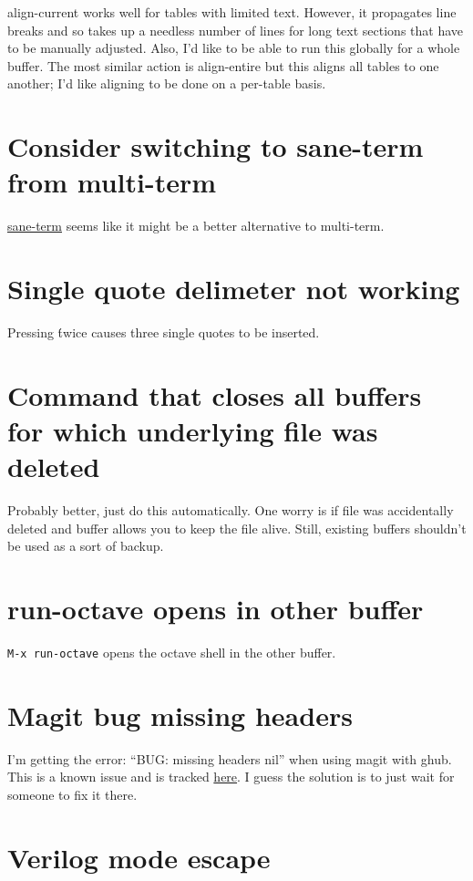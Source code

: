 \documentclass{default}
\begin{document}
align-current works well for tables with limited text. However, it propagates line breaks and so
takes up a needless number of lines for long text sections that have to be manually adjusted. Also,
I'd like to be able to run this globally for a whole buffer. The most similar action is align-entire
but this aligns all tables to one another; I'd like aligning to be done on a per-table basis.

\section{Consider switching to sane-term from multi-term}

\href{https://github.com/adamrt/sane-term}{sane-term} seems like it might be a better alternative to multi-term.

\section{Single quote delimeter not working}

Pressing \' twice causes three single quotes to be inserted.

\section{Command that closes all buffers for which underlying file was deleted}

Probably better, just do this automatically. One worry is if file was accidentally deleted and
buffer allows you to keep the file alive. Still, existing buffers shouldn't be used as a sort of
backup.

\section{run-octave opens in other buffer}

\texttt{M-x run-octave} opens the octave shell in the other buffer.

\section{Magit bug missing headers}

I'm getting the error: ``BUG: missing headers nil'' when using magit with ghub. This is a known
issue and is tracked \href{https://github.com/magit/ghub/issues/81}{here}. I guess the solution is
to just wait for someone to fix it there.

\section{Verilog mode escape}
\end{document}
